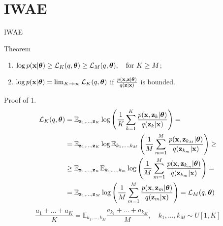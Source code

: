 \section{IWAE}
\begin{frame}{IWAE}
	\begin{block}{Theorem}
		\begin{enumerate}
			\item $\log p(\mathbf{x} | \boldsymbol{\theta}) \geq \mathcal{L}_K (q, \boldsymbol{\theta}) \geq \mathcal{L}_M (q, \boldsymbol{\theta}), \quad \text{for } K \geq M$;
			\item $\log p(\mathbf{x} | \boldsymbol{\theta}) = \lim_{K \rightarrow \infty} \mathcal{L}_K (q, \boldsymbol{\theta})$ if $\frac{p(\mathbf{x}, \mathbf{z} | \boldsymbol{\theta})}{q(\mathbf{z} | \mathbf{x})}$ is bounded.
		\end{enumerate}
		\vspace{-0.2cm}
	\end{block}
	\begin{block}{Proof of 1.}
		{ \footnotesize
			\vspace{-0.6cm}
			\begin{align*}
				\mathcal{L}_K (q, \boldsymbol{\theta}) &= \mathbb{E}_{\mathbf{z}_1, \dots, \mathbf{z}_K} \log \left( \frac{1}{K}\sum_{k=1}^K\frac{p(\mathbf{x}, \mathbf{z}_k | \boldsymbol{\theta})}{q(\mathbf{z}_k| \mathbf{x})} \right) = \\
				&= \mathbb{E}_{\mathbf{z}_1, \dots, \mathbf{z}_K} \log \mathbb{E}_{k_1, \dots, k_M} \left( \frac{1}{M}\sum_{m=1}^M\frac{p(\mathbf{x}, \mathbf{z}_{k_M} | \boldsymbol{\theta})}{q(\mathbf{z}_{k_m}| \mathbf{x})} \right) \geq \\
				&\geq \mathbb{E}_{\mathbf{z}_1, \dots, \mathbf{z}_K} \mathbb{E}_{k_1, \dots, k_m} \log \left( \frac{1}{M}\sum_{m=1}^M\frac{p(\mathbf{x}, \mathbf{z}_{k_m} | \boldsymbol{\theta})}{q(\mathbf{z}_{k_m}| \mathbf{x})} \right) = \\
				&= \mathbb{E}_{\mathbf{z}_1, \dots, \mathbf{z}_M} \log \left( \frac{1}{M}\sum_{m=1}^M\frac{p(\mathbf{x}, \mathbf{z}_m | \boldsymbol{\theta})}{q(\mathbf{z}_m| \mathbf{x})} \right) = \mathcal{L}_M (q, \boldsymbol{\theta})
			\end{align*}
			\[
			\frac{a_1 + \dots + a_K}{K} = \mathbb{E}_{k_1, \dots, k_M} \frac{a_{k_1} + \dots + a_{k_M}}{M}, \quad k_1, \dots, k_M \sim U[1, K]
			\]
		}
	\end{block}
	
\end{frame}
